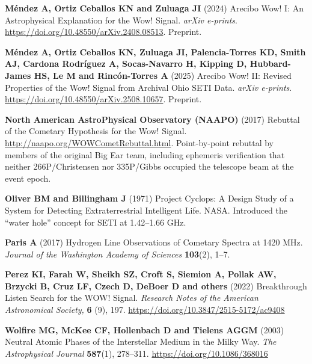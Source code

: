 \documentclass[crop]{CSL}
\begin{document}
\begin{thebibliography}{}
\textbf{M\'endez A, Ortiz Ceballos KN and Zuluaga JI} (2024) Arecibo Wow! I: An Astrophysical Explanation for the Wow! Signal. \textit{arXiv e-prints}. \url{https://doi.org/10.48550/arXiv.2408.08513}. Preprint.

\textbf{M\'endez A, Ortiz Ceballos KN, Zuluaga JI, Palencia-Torres KD, Smith AJ, Cardona Rodr\'iguez A, Socas-Navarro H, Kipping D, Hubbard-James HS, Le M and Rinc\'on-Torres A} (2025) Arecibo Wow! II: Revised Properties of the Wow! Signal from Archival Ohio SETI Data. \textit{arXiv e-prints}. \url{https://doi.org/10.48550/arXiv.2508.10657}. Preprint.

\textbf{North American AstroPhysical Observatory (NAAPO)} (2017) Rebuttal of the Cometary Hypothesis for the Wow! Signal. \url{http://naapo.org/WOWCometRebuttal.html}. Point-by-point rebuttal by members of the original Big Ear team, including ephemeris verification that neither 266P/Christensen nor 335P/Gibbs occupied the telescope beam at the event epoch.

\textbf{Oliver BM and Billingham J} (1971) Project Cyclops: A Design Study of a System for Detecting Extraterrestrial Intelligent Life. NASA. Introduced the ``water hole'' concept for SETI at 1.42--1.66 GHz.

\textbf{Paris A} (2017) Hydrogen Line Observations of Cometary Spectra at 1420 MHz. \textit{Journal of the Washington Academy of Sciences} \textbf{103}(2), 1--7.

\textbf{Perez KI, Farah W, Sheikh SZ, Croft S, Siemion A, Pollak AW, Brzycki B, Cruz LF, Czech D, DeBoer D and others} (2022) Breakthrough Listen Search for the WOW! Signal. \textit{Research Notes of the American Astronomical Society,} \textbf{6} (9), 197. \url{https://doi.org/10.3847/2515-5172/ac9408}

\textbf{Wolfire MG, McKee CF, Hollenbach D and Tielens AGGM} (2003) Neutral Atomic Phases of the Interstellar Medium in the Milky Way. \textit{The Astrophysical Journal} \textbf{587}(1), 278--311. \url{https://doi.org/10.1086/368016}
\end{thebibliography}
\end{document}
